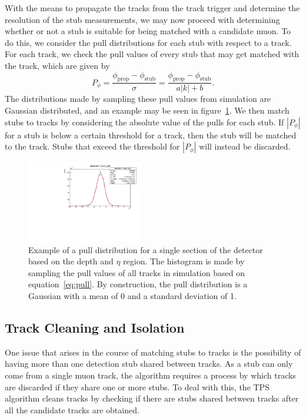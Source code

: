 With the means to propagate the tracks from the track trigger and determine the resolution of the stub measurements, we may now proceed with determining whether or not a stub is suitable for being matched with a candidate muon.
To do this, we consider the pull distributions for each stub with respect to a track.
For each track, we check the pull values of every stub that may get matched with the track, which are given by
\begin{equation}\label{eq:pull}
  P_\phi=\frac{\phi_\mathrm{prop}-\phi_\mathrm{stub}}{\sigma}=\frac{\phi_\mathrm{prop}-\phi_\mathrm{stub}}{a|k|+b}.
\end{equation}
The distributions made by sampling these pull values from simulation are Gaussian distributed, and an example may be seen in figure~\ref{fig:deltaPhiPull}.
We then match stubs to tracks by considering the absolute value of the pulls for each stub.
If $|P_\phi|$ for a stub is below a certain threshold for a track, then the stub will be matched to the track.
Stubs that exceed the threshold for $|P_\phi|$ will instead be discarded.

\begin{figure}[htbp]
  \centering
  \includegraphics[width=0.45\textwidth]{fig/TPS/deltaPhi_pull.pdf}
  \caption{
    Example of a pull distribution for a single section of the detector based on the depth and $\eta$ region.
    The histogram is made by sampling the pull values of all tracks in simulation based on equation~\ref{eq:pull}.
    By construction, the pull distribution is a Gaussian with a mean of 0 and a standard deviation of 1.
  }
  \label{fig:deltaPhiPull}
\end{figure}

\subsection{Track Cleaning and Isolation}
\label{subsec:cleaning}

One issue that arises in the course of matching stubs to tracks is the possibility of having more than one detection stub shared between tracks.
As a stub can only come from a single muon track, the algorithm requires a process by which tracks are discarded if they share one or more stubs.
To deal with this, the TPS algorithm cleans tracks by checking if there are stubs shared between tracks after all the candidate tracks are obtained.

